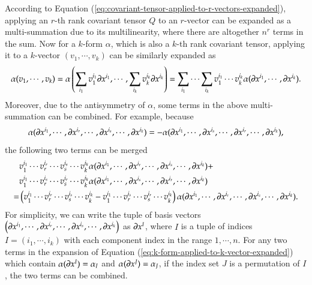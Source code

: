 \documentclass[11pt, a4paper]{book}
\begin{document}
According to Equation (\ref{eq:covariant-tensor-applied-to-r-vectors-expanded}), applying
an $r$-th rank covariant tensor $Q$ to an $r$-vector can be expanded as a multi-summation
due to its multilinearity, where there are altogether $n^r$ terms in the sum. Now for a
$k$-form $\alpha$, which is also a $k$-th rank covariant tensor, applying it to
a $k$-vector $(v_1,\cdots,v_k)$ can be similarly expanded as
\begin{equation}
  \label{eq:k-form-applied-to-k-vector-expanded}
  \alpha(v_{1},\cdots,v_{k}) = \alpha \left(
    \sum_{i_1}v_1^{i_1}\boldsymbol{\partial}x^{i_1},\cdots,\sum_{i_k}v_k^{i_k}\boldsymbol{\partial}x^{i_k}
  \right) = \sum_{i_1}\cdots\sum_{i_k}v_1^{i_1}\cdots v_k^{i_k}
  \alpha(\boldsymbol{\partial}x^{i_1},\cdots, \boldsymbol{\partial}x^{i_k}).
\end{equation}
Moreover, due to the antisymmetry of $\alpha$, some terms in the above multi-summation can
be combined. For example, because
\begin{equation}
  \alpha(\boldsymbol{\partial}x^{i_1},\cdots,\boldsymbol{\partial}x^{i_r},\cdots,\boldsymbol{\partial}x^{i_s},\cdots,\boldsymbol{\partial}x^{i_k})
  =
  -\alpha(\boldsymbol{\partial}x^{i_1},\cdots,\boldsymbol{\partial}x^{i_s},\cdots,\boldsymbol{\partial}x^{i_r},\cdots,\boldsymbol{\partial}x^{i_k}),
\end{equation}
the following two terms can be merged
\begin{equation}
  \begin{aligned}
    & v_1^{i_1} \cdots v_r^{i_r} \cdots v_s^{i_s} \cdots v_k^{i_k}
    \alpha(\boldsymbol{\partial}x^{i_1},\cdots,\boldsymbol{\partial}x^{i_r},\cdots,\boldsymbol{\partial}x^{i_s},\cdots,\boldsymbol{\partial}x^{i_k})
    + \\
    & v_1^{i_1} \cdots v_r^{i_s} \cdots v_s^{i_r} \cdots v_k^{i_k}
    \alpha(\boldsymbol{\partial}x^{i_1},\cdots,\boldsymbol{\partial}x^{i_s},\cdots,\boldsymbol{\partial}x^{i_r},\cdots,\boldsymbol{\partial}x^{i_k})
    \\
    = & \left( v_1^{i_1} \cdots v_r^{i_r} \cdots v_s^{i_s} \cdots v_k^{i_k} - v_1^{i_1}
      \cdots v_r^{i_s} \cdots v_s^{i_r} \cdots v_k^{i_k} \right) \alpha(\boldsymbol{\partial}x^{i_1},\cdots,\boldsymbol{\partial}x^{i_r},\cdots,\boldsymbol{\partial}x^{i_s},\cdots,\boldsymbol{\partial}x^{i_k}).
  \end{aligned}
\end{equation}
For simplicity, we can write the tuple of basis vectors
$\left(
  \boldsymbol{\partial}x^{i_1},\cdots,\boldsymbol{\partial}x^{i_r},\cdots,\boldsymbol{\partial}x^{i_s},\cdots,\boldsymbol{\partial}x^{i_k}
\right)$ as $\boldsymbol{\partial}x^{I}$, where $I$ is a tuple of indices $I = (i_1,\cdots,i_k)$
with each component index in the range $1,\cdots,n$. For any two terms in the expansion of
Equation (\ref{eq:k-form-applied-to-k-vector-expanded}) which contain
$\alpha(\boldsymbol{\partial}x^I) = \alpha_I$ and $\alpha(\boldsymbol{\partial}x^J) = \alpha_J$, if the
index set $J$ is a permutation of $I$, the two terms can be combined.
\end{document}
